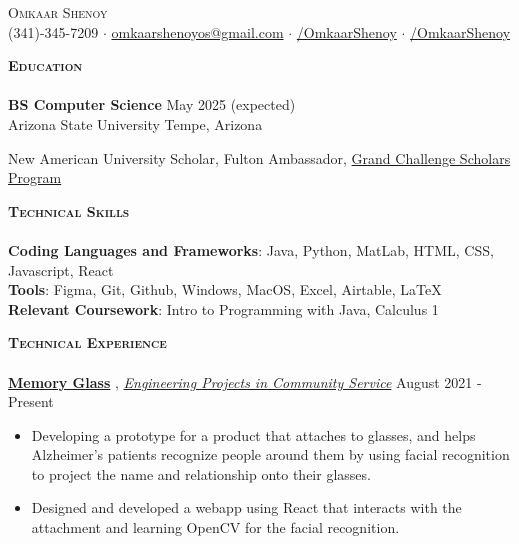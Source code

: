 \documentclass[a4paper]{article}
\newcommand{\lineunder} {
    \vspace*{-8pt} \\
    \hspace*{-18pt} \hrulefill \\
}
\newcommand{\header} [1] {
    {\hspace*{-15pt}\vspace*{3pt} \textsc{#1}}
    \vspace*{-6pt} \lineunder
}
\begin{document}
\vspace*{-30.9pt}



\vspace{-1mm}
\begin{center}
	{\Huge \scshape {Omkaar Shenoy}}\\
	\vspace{2mm}
	\faPhone  \hspace{0.5mm} (341)-345-7209 $\cdot$ \href{mailto:omkaarshenoyos@gmail.com}{\faEnvelope \hspace{0.5mm} omkaarshenoyos@gmail.com} \hspace{0.5mm}   $\cdot$ \href{https://www.linkedin.com/in/OmkaarShenoy/}{\faLinkedin/OmkaarShenoy} $\cdot$ \href{https://github.com/OmkaarShenoy}{\faGithub/OmkaarShenoy}
	
\end{center}




    \header{\textbf{Education}}

\textbf{BS Computer Science} \hfill May 2025 (expected)
\\ Arizona State University \hfill Tempe, Arizona
 
New American University Scholar, Fulton Ambassador, \href{https://gcsp.engineering.asu.edu/}{Grand Challenge Scholars Program} \faExternalLink \\


\vspace{1mm}

\header{\textbf{Technical Skills}}



\textbf{Coding Languages and Frameworks}: Java, Python, MatLab, HTML, CSS, Javascript, React \\
\textbf{Tools}: Figma, Git, Github, Windows, MacOS, Excel, Airtable, \LaTeX \\
\textbf{Relevant Coursework}: Intro to Programming with Java, Calculus 1 \\
\vspace{1mm}


\header{\textbf{Technical Experience}}
\href{https://www.memoryglass.net}{\textbf{Memory Glass}}  \faExternalLink, \href{https://epics.engineering.asu.edu/}{\textit{Engineering Projects in Community Service}} \faExternalLink
\hfill August 2021 - Present\\
\vspace{-3mm}
\begin{itemize}
    \item Developing a prototype for a product that attaches to glasses, and helps Alzheimer's patients recognize people around them by using facial recognition to project the name and relationship onto their glasses. 
    \item Designed and developed a webapp using React that interacts with the attachment and learning OpenCV for the facial recognition. 
\end{itemize}
\end{document}
